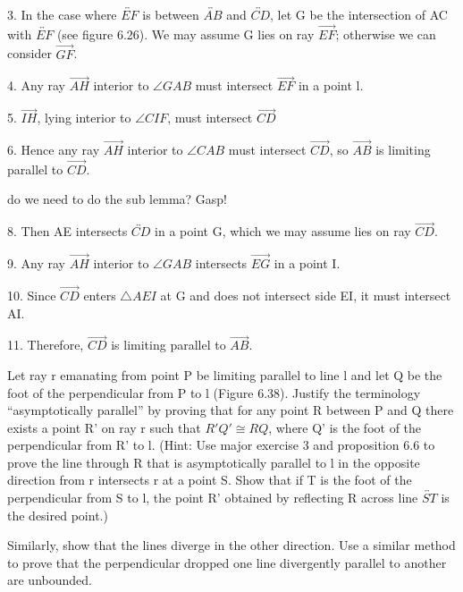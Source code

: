 \documentclass[12pt,letterpaper]{article}
\newcommand{\prob}[1]{\newpage\noindent {\bf #1}}
\begin{document}
3. In the case where $\overleftrightarrow{EF}$ is between $\overleftrightarrow{AB}$ and $\overleftrightarrow{CD}$, let G be the intersection of AC with $\overleftrightarrow{EF}$ (see figure 6.26).  We may assume G lies on ray $\overrightarrow{EF}$; otherwise we can consider $\overrightarrow{GF}$.

4. Any ray $\overrightarrow{AH}$ interior to $\angle GAB$ must intersect $\overrightarrow{EF}$ in a point l.

5. $\overrightarrow{IH}$, lying interior to $\angle CIF$, must intersect $\overrightarrow{CD}$

6. Hence any ray $\overrightarrow{AH}$ interior to $\angle CAB$ must intersect $\overrightarrow{CD}$, so $\overrightarrow{AB}$ is limiting parallel to $\overrightarrow{CD}$. 

do we need to do the sub lemma? Gasp!

8. Then AE intersects $\overleftrightarrow{CD}$ in a point G, which we may assume lies on ray $\overrightarrow{CD}$. 

9. Any ray $\overrightarrow{AH}$ interior to $\angle GAB$ intersects $\overrightarrow{EG}$ in a point I.

10.  Since $\overrightarrow{CD}$ enters $\triangle AEI$ at G and does not intersect side EI, it must intersect AI.

11. Therefore, $\overrightarrow{CD}$ is limiting parallel to $\overrightarrow{AB}$. 




\prob{Major Exercises 11 } Let ray r emanating from point P be limiting parallel to line l and let Q be the foot of the perpendicular from P to l (Figure 6.38).  Justify the terminology ``asymptotically parallel'' by proving that for any point R between P and Q there exists a point R' on ray r such that $R'Q' \cong RQ$, where Q' is the foot of the perpendicular from R' to l.  (Hint: Use major exercise 3 and proposition 6.6 to prove the line through R that is asymptotically parallel to l in the opposite direction from r intersects r at a point S.  Show that if T is the foot of the perpendicular from S to l, the point R' obtained by reflecting R across line $\overleftrightarrow{ST}$ is the desired point.)

	Similarly, show that the lines diverge in the other direction.  Use a similar method to prove that the perpendicular dropped one line divergently parallel to another are unbounded. 
\end{document}
